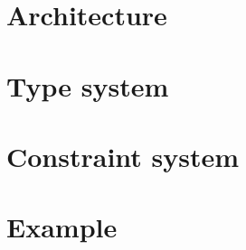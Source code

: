 \documentclass[10pt]{article}
\title{}
\author{Frank Dedden \and Wilco Kusee}
\begin{document}
\maketitle

\section{Architecture}


\section{Type system}


\section{Constraint system}


\section{Example}
\end{document}
